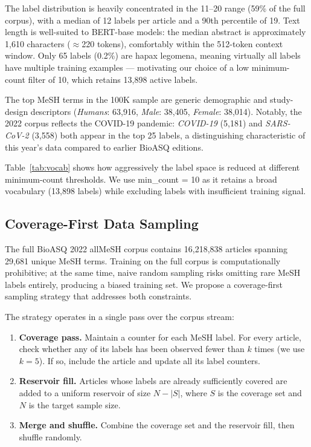 \documentclass[sigconf]{acmart}
\begin{document}
The label distribution is heavily concentrated in the 11--20 range (59\% of the full corpus),
with a median of 12 labels per article and a 90th percentile of 19. Text length is well-suited
to BERT-base models: the median abstract is approximately 1{,}610 characters ($\approx$220
tokens), comfortably within the 512-token context window. Only 65 labels (0.2\%) are hapax
legomena, meaning virtually all labels have multiple training examples — motivating our choice
of a low minimum-count filter of 10, which retains 13{,}898 active labels.

The top MeSH terms in the 100K sample are generic demographic and study-design descriptors
(\textit{Humans}: 63{,}916, \textit{Male}: 38{,}405, \textit{Female}: 38{,}014). Notably,
the 2022 corpus reflects the COVID-19 pandemic: \textit{COVID-19} (5{,}181) and
\textit{SARS-CoV-2} (3{,}558) both appear in the top 25 labels, a distinguishing
characteristic of this year's data compared to earlier BioASQ editions.

Table~\ref{tab:vocab} shows how aggressively the label space is reduced at different
minimum-count thresholds. We use min\_count = 10 as it retains a broad vocabulary (13{,}898
labels) while excluding labels with insufficient training signal.

\subsection{Coverage-First Data Sampling}
\label{sec:sampling}

The full BioASQ 2022 allMeSH corpus contains 16{,}218{,}838 articles spanning 29{,}681 unique MeSH
terms. Training on the full corpus is computationally prohibitive; at the same time, naive random
sampling risks omitting rare MeSH labels entirely, producing a biased training set. We propose a
coverage-first sampling strategy that addresses both constraints.

The strategy operates in a single pass over the corpus stream:

\begin{enumerate}
    \item \textbf{Coverage pass.} Maintain a counter for each MeSH label. For every article,
    check whether any of its labels has been observed fewer than $k$ times (we use $k = 5$).
    If so, include the article and update all its label counters.
    \item \textbf{Reservoir fill.} Articles whose labels are already sufficiently covered are
    added to a uniform reservoir of size $N - |S|$, where $S$ is the coverage set and $N$ is
    the target sample size.
    \item \textbf{Merge and shuffle.} Combine the coverage set and the reservoir fill, then
    shuffle randomly.
\end{enumerate}
\end{document}
